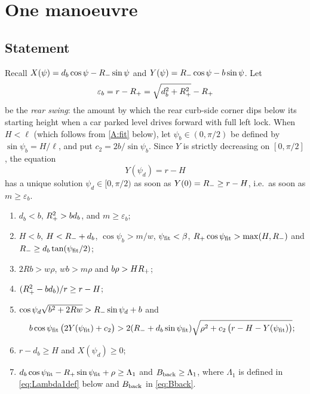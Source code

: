\section{One manoeuvre}\label{sec:one}

\subsection{Statement}
Recall $X(\psi)=d_b\cos\psi-R_{-}\sin\psi$ and $Y(\psi)=R_{-}\cos\psi-b\sin\psi$.
Let
\[
  \varepsilon_b=r-R_{+}=\sqrt{d_b^2+R_{+}^2}-R_{+}
\]
be the \emph{rear swing}: the amount by which the rear curb-side corner dips below its starting height when a car parked level drives forward with full left lock.
When $H<\ell$ (which follows from \ref{A:fit} below), let $\psi_b\in(0,\pi/2)$ be defined by $\sin\psi_b=H/\ell$, and put $c_2=2b/\sin\psi_b$.
Since $Y$ is strictly decreasing on $[0,\pi/2]$, the equation
\begin{equation}\label{eq:psid}
  Y(\psi_d)=r-H
\end{equation}
has a unique solution $\psi_d\in[0,\pi/2)$ as soon as $Y(0)=R_{-}\ge r-H$, i.e.\ as soon as $m\ge\varepsilon_b$.

\begin{assumption}\label{ass:one}
\leavevmode
\begin{enumerate}[label=(A\arabic*),nosep]
\item\label{A:db} $d_b<b$, $R_{+}^2>bd_b$, and $m\ge\varepsilon_b$;
\item\label{A:fit} $H<b$, $H<R_{-}+d_b$, $\cos\psi_b>m/w$, $\psi_{\rm fit}<\beta$, $R_{+}\cos\psi_{\rm fit}>\max(H,R_{-})$ and $R_{-}\ge d_b\tan(\psi_{\rm fit}/2)$;
\item\label{A:nose} $2Rb>w\rho$, $wb>m\rho$ and $b\rho>HR_{+}$;
\item\label{A:curbcase} $(R_{+}^2-bd_b)/r\ge r-H$;
\item\label{A:min} $\cos\psi_d\sqrt{b^2+2Rw}>R_{-}\sin\psi_d+b$ and
 \[
   b\cos\psi_{\rm fit}\,\big(2Y(\psi_{\rm fit})+c_2\big)>2(R_{-}+d_b\sin\psi_{\rm fit})\sqrt{\rho^2+c_2\,\big(r-H-Y(\psi_{\rm fit})\big)};
 \]
\item\label{A:end} $r-d_b\ge H$ and $X(\psi_d)\ge0$;
\item\label{A:far} $d_b\cos\psi_{\rm fit}-R_{+}\sin\psi_{\rm fit}+\rho\ge\Lambda_1$ and $B_{\rm back}\ge\Lambda_1$, where $\Lambda_1$ is defined in \eqref{eq:Lambda1def} below and $B_{\rm back}$ in \eqref{eq:Bback}.
\end{enumerate}
\end{assumption}

